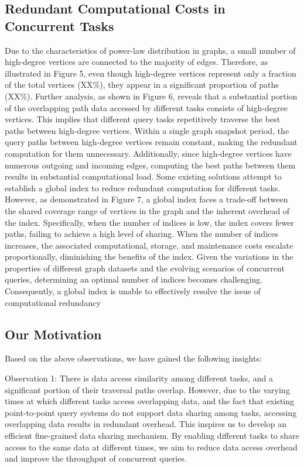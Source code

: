 \documentclass[lettersize,journal]{IEEEtran} %
\begin{document}
\subsection{Redundant Computational Costs in Concurrent Tasks}
Due to the characteristics of power-law distribution in graphs, a small number of high-degree vertices are connected to the majority of edges. Therefore, as illustrated in Figure 5, even though high-degree vertices represent only a fraction of the total vertices (XX\%), they appear in a significant proportion of paths (XX\%). Further analysis, as shown in Figure 6, reveals that a substantial portion of the overlapping path data accessed by different tasks consists of high-degree vertices. This implies that different query tasks repetitively traverse the best paths between high-degree vertices. Within a single graph snapshot period, the query paths between high-degree vertices remain constant, making the redundant computation for them unnecessary. Additionally, since high-degree vertices have numerous outgoing and incoming edges, computing the best paths between them results in substantial computational load. Some existing solutions attempt to establish a global index to reduce redundant computation for different tasks. However, as demonstrated in Figure 7, a global index faces a trade-off between the shared coverage range of vertices in the graph and the inherent overhead of the index. Specifically, when the number of indices is low, the index covers fewer paths, failing to achieve a high level of sharing. When the number of indices increases, the associated computational, storage, and maintenance costs escalate proportionally, diminishing the benefits of the index. Given the variations in the properties of different graph datasets and the evolving scenarios of concurrent queries, determining an optimal number of indices becomes challenging. Consequently, a global index is unable to effectively resolve the issue of computational redundancy

\subsection{Our Motivation}
Based on the above observations, we have gained the following insights:

Observation 1: There is data access similarity among different tasks, and a significant portion of their traversal paths overlap. However, due to the varying times at which different tasks access overlapping data, and the fact that existing point-to-point query systems do not support data sharing among tasks, accessing overlapping data results in redundant overhead. This inspires us to develop an efficient fine-grained data sharing mechanism. By enabling different tasks to share access to the same data at different times, we aim to reduce data access overhead and improve the throughput of concurrent queries.
\end{document}
